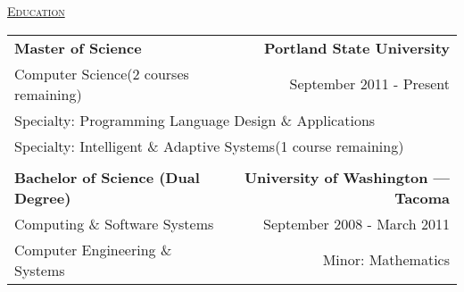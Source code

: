 \documentclass[letterpaper]{article}
\begin{document}
\begin{center}
		\underline{\large \scshape Education} \\
		\begin{tabular}{p{}r}
				\textbf{Master of Science}							&
				\textbf{Portland State University}
			\\
				Computer Science\quad(2 courses remaining)				&
				September 2011 - Present
			\\
				\multicolumn{2}{p{\textwidth}}{Specialty: Programming Language Design \& Applications}
			\\	
				\multicolumn{2}{p{\textwidth}}{Specialty: Intelligent \& Adaptive Systems\quad(1 course remaining)}
				
			\\
			\\
				\textbf{Bachelor of Science (Dual Degree)}			&
				\textbf{University of Washington — Tacoma}
			\\
				Computing \& Software Systems						&
				September 2008 - March 2011
			\\
				Computer Engineering \& Systems						&
				Minor: Mathematics
		\end{tabular}
	\end{center}
\end{document}
